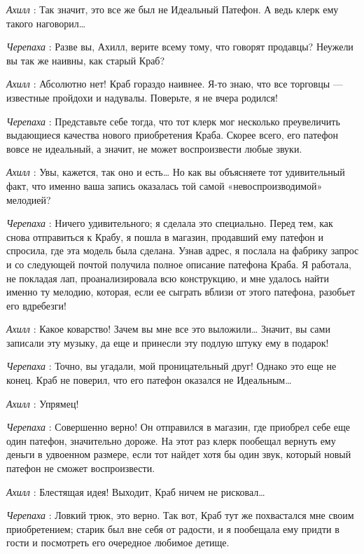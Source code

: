 \emph{Ахилл} : Так значит, это все же был не Идеальный Патефон. А ведь клерк ему такого наговорил\ldots{}

\emph{Черепаха} : Разве вы, Ахилл, верите всему тому, что говорят продавцы? Неужели вы так же наивны, как старый Краб?

\emph{Ахилл} : Абсолютно нет! Краб гораздо наивнее. Я-то знаю, что все торговцы --- известные пройдохи и надувалы. Поверьте, я не вчера родился!

\emph{Черепаха} : Представьте себе тогда, что тот клерк мог несколько преувеличить выдающиеся качества нового приобретения Краба. Скорее всего, его патефон вовсе не идеальный, а значит, не может воспроизвести любые звуки.

\emph{Ахилл} : Увы, кажется, так оно и есть\ldots{} Но как вы объясняете тот удивительный факт, что именно ваша запись оказалась той самой «невоспроизводимой» мелодией?

\emph{Черепаха} : Ничего удивительного; я сделала это специально. Перед тем, как снова отправиться к Крабу, я пошла в магазин, продавший ему патефон и спросила, где эта модель была сделана. Узнав адрес, я послала на фабрику запрос и со следующей почтой получила полное описание патефона Краба. Я работала, не покладая лап, проанализировала всю конструкцию, и мне удалось найти именно ту мелодию, которая, если ее сыграть вблизи от этого патефона, разобьет его вдребезги!

\emph{Ахилл} : Какое коварство! Зачем вы мне все это выложили\ldots{} Значит, вы сами записали эту музыку, да еще и принесли эту подлую штуку ему в подарок!

\emph{Черепаха} : Точно, вы угадали, мой проницательный друг! Однако это еще не конец. Краб не поверил, что его патефон оказался не Идеальным\ldots{}

\emph{Ахилл} : Упрямец!

\emph{Черепаха} : Совершенно верно! Он отправился в магазин, где приобрел себе еще один патефон, значительно дороже. На этот раз клерк пообещал вернуть ему деньги в удвоенном размере, если тот найдет хотя бы один звук, который новый патефон не сможет воспроизвести.

\emph{Ахилл} : Блестящая идея! Выходит, Краб ничем не рисковал\ldots{}

\emph{Черепаха} : Ловкий трюк, это верно. Так вот, Краб тут же похвастался мне своим приобретением; старик был вне себя от радости, и я пообещала ему придти в гости и посмотреть его очередное любимое детище.

